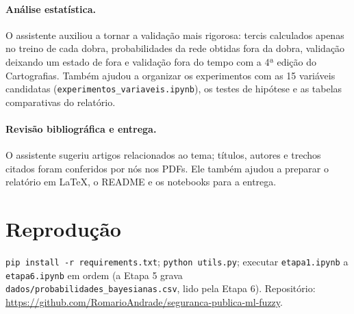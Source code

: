 \documentclass[10pt,a4paper,twocolumn]{article}
\begin{document}
\paragraph{Análise estatística.} O assistente auxiliou a tornar a validação mais rigorosa:
tercis calculados apenas no treino de cada dobra, probabilidades da rede obtidas fora da
dobra, validação deixando um estado de fora e validação fora do tempo com a 4ª edição do
Cartografias. Também ajudou a organizar os experimentos com as 15 variáveis candidatas
(\texttt{experimentos\_variaveis.ipynb}), os testes de hipótese e as tabelas comparativas do
relatório.

\paragraph{Revisão bibliográfica e entrega.} O assistente sugeriu artigos relacionados ao
tema; títulos, autores e trechos citados foram conferidos por nós nos PDFs. Ele também
ajudou a preparar o relatório em \LaTeX, o README e os notebooks para a entrega.

\section{Reprodução}

\texttt{pip install -r requirements.txt}; \texttt{python utils.py}; executar
\texttt{etapa1.ipynb} a \texttt{etapa6.ipynb} em ordem (a Etapa 5 grava
\texttt{dados/probabilidades\_bayesianas.csv}, lido pela Etapa 6). Repositório:
\url{https://github.com/RomarioAndrade/seguranca-publica-ml-fuzzy}.
\end{document}
